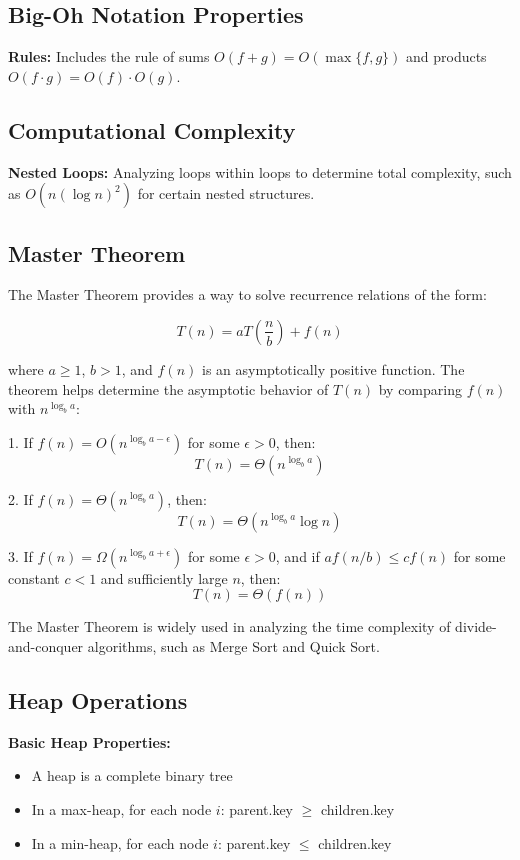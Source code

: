 \subsection{Big-Oh Notation Properties}
\textbf{Rules:} Includes the rule of sums $O(f + g) = O(\max\{f, g\})$ and products $O(f \cdot g) = O(f) \cdot O(g)$.

\subsection{Computational Complexity}
\textbf{Nested Loops:} Analyzing loops within loops to determine total complexity, such as $O(n(\log n)^2)$ for certain nested structures.

\subsection{Master Theorem}
The Master Theorem provides a way to solve recurrence relations of the form:

\[ T(n) = aT\left(\frac{n}{b}\right) + f(n) \]

where $a \geq 1$, $b > 1$, and $f(n)$ is an asymptotically positive function. The theorem helps determine the asymptotic behavior of $T(n)$ by comparing $f(n)$ with $n^{\log_b a}$:

1. If $f(n) = O(n^{\log_b a - \epsilon})$ for some $\epsilon > 0$, then:
   \[ T(n) = \Theta(n^{\log_b a}) \]

2. If $f(n) = \Theta(n^{\log_b a})$, then:
   \[ T(n) = \Theta(n^{\log_b a} \log n) \]

3. If $f(n) = \Omega(n^{\log_b a + \epsilon})$ for some $\epsilon > 0$, and if $af(n/b) \leq cf(n)$ for some constant $c < 1$ and sufficiently large $n$, then:
   \[ T(n) = \Theta(f(n)) \]

The Master Theorem is widely used in analyzing the time complexity of divide-and-conquer algorithms, such as Merge Sort and Quick Sort.

\subsection{Heap Operations}
\textbf{Basic Heap Properties:}
\begin{itemize}
    \item A heap is a complete binary tree
    \item In a max-heap, for each node $i$: parent.key $\geq$ children.key
    \item In a min-heap, for each node $i$: parent.key $\leq$ children.key
\end{itemize}

